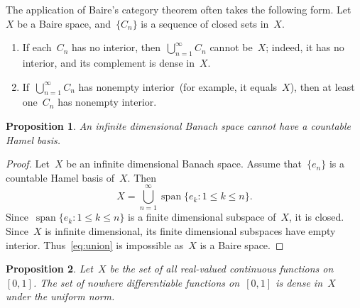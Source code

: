 \documentclass[11pt,a4paper]{article}  %
\newtheorem{proposition}{Proposition}[section]
\theoremstyle{definition}
\DeclareMathOperator{\Span}{span}
\numberwithin{equation}{section}
\begin{document}
The application of Baire's category theorem often takes the following form. Let~$X$ be a Baire
space, and~$\{C_n\}$ is a sequence of closed sets in~$X$.
\begin{enumerate}
    \item If each~$C_n$ has no interior, then~$\bigcup_{n=1}^\infty C_n$ cannot be~$X$; indeed, it
        has no interior, and its complement is dense in~$X$.
    \item If~$\bigcup_{n=1}^\infty C_n$ has nonempty interior~(for example, it equals~$X$), then at least
        one~$C_n$ has nonempty interior.
\end{enumerate}

\begin{proposition}
    \label{prop:banach}
    An infinite dimensional Banach space cannot have a countable Hamel basis.
\end{proposition}

\begin{proof}
    Let~$X$ be an infinite dimensional Banach space. Assume that~$\{e_n\}$ is a countable Hamel basis of~$X$.
    Then
    \begin{equation}
        \label{eq:union}
        X = \bigcup_{n=1}^\infty \Span\{e_k \mathrel{:} 1\le k \le n\}.
    \end{equation}
    Since~$\Span\{e_k \mathrel{:} 1\le k \le n\}$ is a finite dimensional subspace of~$X$, it is
    closed. Since~$X$ is infinite dimensional, its finite dimensional subspaces have empty interior.
    Thus~\eqref{eq:union} is impossible as~$X$ is a Baire space.
\end{proof}

\begin{proposition}
    \label{prop:nodiff}
    Let~$X$ be the set of all real-valued continuous functions on $[0,1]$.
    The set of nowhere differentiable functions on~$[0,1]$ is dense in~$X$ under the uniform norm.
\end{proposition}
\end{document}
